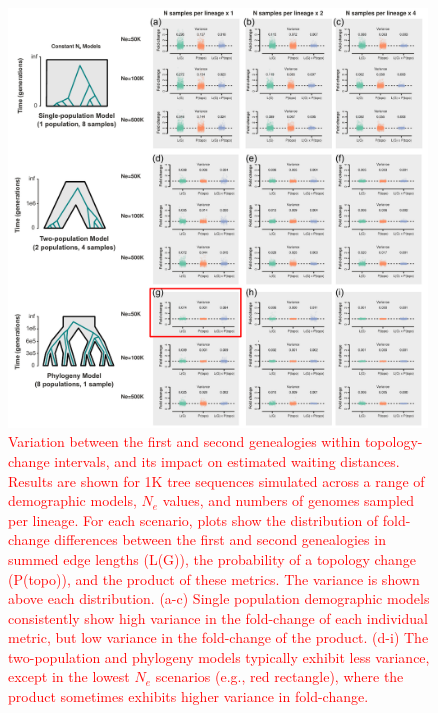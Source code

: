 \documentclass[11pt]{article}
\begin{document}
\begin{figure}[p]
	\centering
	\includegraphics[width=0.99\textwidth]{figures/current/FigS-bias-fold-topo-first-2.pdf}
	\caption{
		\textcolor{red}{
		Variation between the first and second genealogies within topology-change 
		intervals, and its impact on estimated waiting distances.
		Results are shown for 1K tree sequences simulated across a range of 
		demographic models, $N_e$ values, and numbers of genomes sampled per lineage.
		For each scenario, plots show the distribution of fold-change differences
		between the first and second genealogies in summed edge lengths (L(G)),
		the probability of a topology change (P(topo)), and the product of these
		metrics. The variance is shown above each distribution.
		(a-c) Single population demographic models consistently show high variance
		in the fold-change of each individual metric, but low variance in the
		fold-change of the product.
		(d-i) The two-population and phylogeny models typically exhibit less 
		variance, except in the lowest $N_e$ scenarios (e.g., red rectangle),
		where the product sometimes exhibits higher variance in fold-change.
}}
\end{figure}
\end{document}
